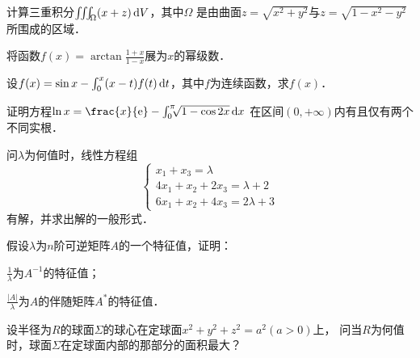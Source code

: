 \documentclass[plain,noanswer,medmath]{../../template/jnuexam}
\begin{document}
\begin{problem}
计算三重积分$\iiint_{\Omega}(x+z)\d V$，其中$\Omega$
是由曲面$z=\sqrt{x^2+y^2}$与$z=\sqrt{1-x^2-y^2}$所围成的区域．
\end{problem}



\begin{problem}
将函数$f(x)=\arctan\frac{1+x}{1-x}$展为$x$的幂级数．
\end{problem}



\begin{problem}
设$f(x)=\sin x-\int_0^x (x-t)f(t)\mathop{}\!\mathrm{d} t$，其中$f$为连续函数，求$f(x)$．
\end{problem}



\begin{problem}
证明方程$\ln x=\frac{x}{\e}-\int_0^{\pi}\!\!\!\sqrt{1-\cos 2x}\dx$
在区间$(0,+\infty)$内有且仅有两个不同实根．
\end{problem}



\begin{problem}
问$\lambda$为何值时，线性方程组
$$\begin{cases}
  x_1+ x_3=\lambda \\
  4x_1+x_2+2x_3=\lambda +2 \\
  6x_1+x_2+4x_3=2\lambda +3
\end{cases}$$
有解，并求出解的一般形式．
\end{problem}



\begin{problem}
假设$\lambda$为$n$阶可逆矩阵$A$的一个特征值，证明：\par
\begin{enumerate*}
\item $\frac{1}{\lambda}$为$A^{-1}$的特征值；
\item $\frac{|A|}{\lambda}$为$A$的伴随矩阵$A^*$的特征值．
\end{enumerate*}
\end{problem}



\begin{problem}
设半径为$R$的球面$\Sigma$的球心在定球面$x^2+y^2+z^2=a^2(a>0)$上，
问当$R$为何值时，球面$\Sigma$在定球面内部的那部分的面积最大？
\end{problem}
\end{document}
